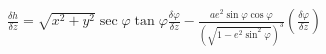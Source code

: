 \documentclass{standalone}
\begin{document}
    $\frac{\delta h}{\delta z} = \sqrt{x^2+y^2} {\sec \varphi} {\tan \varphi} \frac{\delta\varphi}{\delta z} - \frac{a e^2 {\sin\varphi}{\cos\varphi}}{(\sqrt{1-e^2{\sin^2 \varphi}})^3}(\frac{\delta\varphi}{\delta z})$
\end{document}
